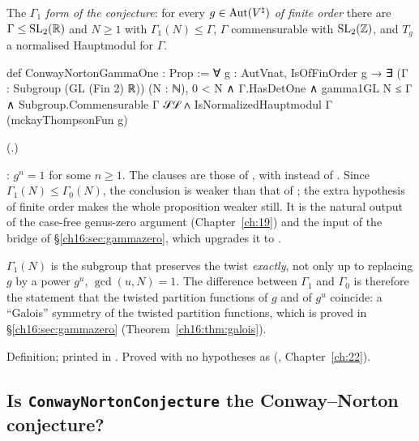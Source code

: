 \begin{definition}\label{ch16:def:gammaone}
The \emph{$\Gamma_1$ form of the conjecture}: for every $g\in\operatorname{Aut}({V^{\natural}})$ \emph{of finite order} there are
$\Gamma\le\mathrm{SL}_2(\mathbb{R})$ and $N\ge1$ with $\Gamma_1(N)\le\Gamma$, $\Gamma$ commensurable with $\mathrm{SL}_2(\mathbb{Z})$, and $T_g$
a normalised Hauptmodul for $\Gamma$.
\end{definition}
\begin{leancode}
def ConwayNortonGammaOne : Prop :=
  ∀ g : AutVnat, IsOfFinOrder g → ∃ (Γ : Subgroup (GL (Fin 2) ℝ)) (N : ℕ),
    0 < N ∧ Γ.HasDetOne ∧ gamma1GL N ≤ Γ ∧ Subgroup.Commensurable Γ 𝒮ℒ ∧
      IsNormalizedHauptmodul Γ (mckayThompsonFun g)
\end{leancode}
(.)
\begin{dictionary}
: $g^n=1$ for some $n\ge1$.  The clauses are those of , with
 instead of .  Since $\Gamma_1(N)\le\Gamma_0(N)$, the conclusion is weaker than that
of ; the extra hypothesis of finite order makes the whole proposition weaker still.  It is the
natural output of the case-free genus-zero argument (Chapter~\ref{ch:19}) and the input of the bridge of
\S\ref{ch16:sec:gammazero}, which upgrades it to .
\end{dictionary}
\begin{physics}
$\Gamma_1(N)$ is the subgroup that preserves the twist \emph{exactly}, not only up to replacing $g$ by a power
$g^u$, $\gcd(u,N)=1$.  The difference between $\Gamma_1$ and $\Gamma_0$ is therefore the statement that the twisted
partition functions of $g$ and of $g^u$ coincide: a ``Galois'' symmetry of the twisted partition functions, which is
proved in \S\ref{ch16:sec:gammazero} (Theorem~\ref{ch16:thm:galois}).
\end{physics}
\begin{status}
Definition; printed in .  Proved with no hypotheses as
 (, Chapter~\ref{ch:22}).
\end{status}

\subsection{Is \texttt{ConwayNortonConjecture} the Conway--Norton conjecture?}\label{ch16:sec:fidelity}

